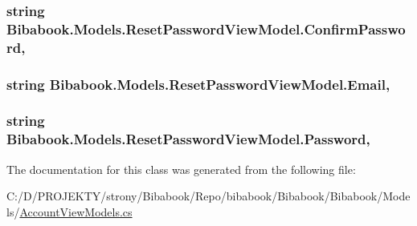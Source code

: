 \subsubsection[{Confirm\+Password}]{\setlength{\rightskip}{0pt plus 5cm}string Bibabook.\+Models.\+Reset\+Password\+View\+Model.\+Confirm\+Password\hspace{0.3cm}{\ttfamily [get]}, {\ttfamily [set]}}\label{class_bibabook_1_1_models_1_1_reset_password_view_model_a20b683f5b74a7c341232c836b70c1e5e}
\hypertarget{class_bibabook_1_1_models_1_1_reset_password_view_model_a0e8dc35a8fa18abf7040660b41adbf99}{}
\subsubsection[{Email}]{\setlength{\rightskip}{0pt plus 5cm}string Bibabook.\+Models.\+Reset\+Password\+View\+Model.\+Email\hspace{0.3cm}{\ttfamily [get]}, {\ttfamily [set]}}\label{class_bibabook_1_1_models_1_1_reset_password_view_model_a0e8dc35a8fa18abf7040660b41adbf99}
\hypertarget{class_bibabook_1_1_models_1_1_reset_password_view_model_ad35ad3fa2c5eb086b2c0d38912f27fc5}{}
\subsubsection[{Password}]{\setlength{\rightskip}{0pt plus 5cm}string Bibabook.\+Models.\+Reset\+Password\+View\+Model.\+Password\hspace{0.3cm}{\ttfamily [get]}, {\ttfamily [set]}}\label{class_bibabook_1_1_models_1_1_reset_password_view_model_ad35ad3fa2c5eb086b2c0d38912f27fc5}


The documentation for this class was generated from the following file\+:\begin{DoxyCompactItemize}
\item 
C\+:/\+D/\+P\+R\+O\+J\+E\+K\+T\+Y/strony/\+Bibabook/\+Repo/bibabook/\+Bibabook/\+Bibabook/\+Models/\hyperlink{_account_view_models_8cs}{Account\+View\+Models.\+cs}\end{DoxyCompactItemize}
